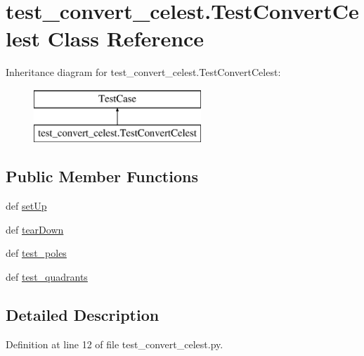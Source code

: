 \hypertarget{classtest__convert__celest_1_1_test_convert_celest}{\section{test\-\_\-convert\-\_\-celest.\-Test\-Convert\-Celest Class Reference}
\label{classtest__convert__celest_1_1_test_convert_celest}
}
Inheritance diagram for test\-\_\-convert\-\_\-celest.\-Test\-Convert\-Celest\-:\begin{figure}[H]
\begin{center}
\leavevmode
\includegraphics[height=2.000000cm]{df/d88/classtest__convert__celest_1_1_test_convert_celest}
\end{center}
\end{figure}
\subsection*{Public Member Functions}
\begin{DoxyCompactItemize}
\item 
def \hyperlink{classtest__convert__celest_1_1_test_convert_celest_a8fd1939ab7d996c7923408df42a13b0f}{set\-Up}
\item 
def \hyperlink{classtest__convert__celest_1_1_test_convert_celest_aaf41fa49cf37ddbad86b6e6af4827db1}{tear\-Down}
\item 
def \hyperlink{classtest__convert__celest_1_1_test_convert_celest_a086e6c724cb8acc6d7bfbca28db421b7}{test\-\_\-poles}
\item 
def \hyperlink{classtest__convert__celest_1_1_test_convert_celest_a5fb62371cbd71130b2f2b55792e7595e}{test\-\_\-quadrants}
\end{DoxyCompactItemize}


\subsection{Detailed Description}


Definition at line 12 of file test\-\_\-convert\-\_\-celest.\-py.



